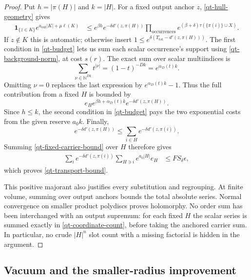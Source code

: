 \documentclass[11pt]{article}
\theoremstyle{remark}
\begin{document}
\begin{proof}
Put $h=|\pi(H)|$ and $k=|H|$. For a fixed output anchor $z$,
\eqref{qt-hull-geometry} gives
\begin{align}
 \mathbf1_{\{z\in K\}}
 e^{a_{\mathrm{out}}|K|+\mu\ell(K)}
 &\le e^{\beta h}e^{-\delta d'(z,\pi(H))}
       \prod_{\text{occurrences}}
       e^{(\beta+\delta)\tau(\{\pi(i)\}\cup X)}.       \label{qt-anchor-hull}
\end{align}
If $z\notin K$ this is automatic; otherwise insert
$1\le e^{\delta(T_{\mathrm{tot}}-d'(z,\pi(H)))}$.
The first condition in \eqref{qt-budget} lets us sum each scalar
occurrence's support using \eqref{qt-background-norm}, at cost $s(r)$.
The exact sum over scalar multiindices is
\begin{equation}\label{qt-coordinate-count}
 \sum_{\nu\in\mathbb N^{Dk}}t^{|\nu|}
    =(1-t)^{-Dk}=e^{\alpha_D(t)k}.
\end{equation}
Omitting $\nu=0$ replaces the last expression by
$e^{\alpha_D(t)k}-1$. Thus the full contribution from a fixed $H$
is bounded by
\begin{equation}\label{qt-fixed-carrier-bound}
 e_H e^{\beta h+\alpha_D(t)k}
                  e^{-\delta d'(z,\pi(H))}.
\end{equation}
Since $h\le k$, the second condition in \eqref{qt-budget} pays
the two exponential costs from the given reserve $a_0 k$.
Finally,
\begin{equation}\label{qt-reroot}
 e^{-\delta d'(z,\pi(H))}
    \le\sum_{i\in H}e^{-\delta d'(z,\pi(i))}.
\end{equation}
Summing \eqref{qt-fixed-carrier-bound} over $H$ therefore gives
\begin{align}
 \sum_i e^{-\delta d'(z,\pi(i))}
             \sum_{H\ni i}e^{a_0|H|}e_H
 &\le F S_\delta\epsilon,                              \label{qt-final-majorant}
\end{align}
which proves \eqref{qt-transport-bound}.

This positive majorant also justifies every substitution and
regrouping. At finite volume, summing over output anchors bounds
the total absolute series. Normal convergence on smaller product
polydiscs proves holomorphy. No order sum has been interchanged
with an output supremum: for each fixed $H$ the scalar series is
summed exactly in \eqref{qt-coordinate-count}, before taking the
anchored carrier sum. In particular, no crude $|H|^n$ slot count
with a missing factorial is hidden in the argument.
\end{proof}

\subsection{Vacuum and the smaller-radius improvement}
\end{document}

